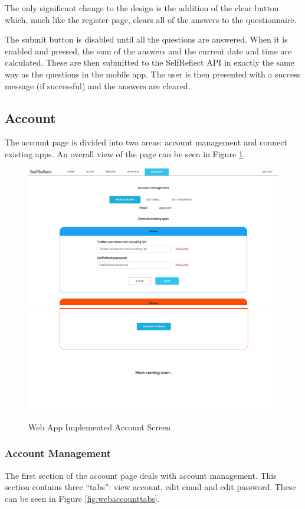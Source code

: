 \documentclass[11pt,openright,a4paper]{report}
\begin{document}
\newpage
The only significant change to the design is the addition of the clear button which, much like the register page, clears all of the answers to the questionnaire.

The submit button is disabled until all the questions are answered. When it is enabled and pressed, the sum of the answers and the current date and time are calculated. These are then submitted to the SelfReflect API in exactly the same way as the questions in the mobile app. The user is then presented with a success message (if successful) and the answers are cleared.

\subsection{Account}
The account page is divided into two areas: account management and connect existing apps. An overall view of the page can be seen in Figure \ref{fig:webaccountimpl}.

\begin{figure}[ht]
\centering
\caption{Web App Implemented Account Screen}
\includegraphics[width=.8\textwidth]{i/webaccountimpltop.png}
\includegraphics[width=.8\textwidth]{i/webaccountimplbottom.png}
\label{fig:webaccountimpl}
\end{figure}

\subsubsection{Account Management}
The first section of the account page deals with account management. This section contains three \enquote{tabs}: view account, edit email and edit password. These can be seen in Figure \ref{fig:webaccounttabs}.
\end{document}
